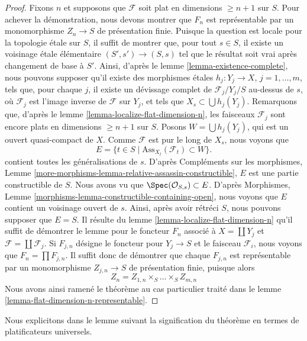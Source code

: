 \begin{proof}
\medskip\noindent
Fixons $n$ et supposons que $\mathcal{F}$ soit plat en dimensions $\geq n + 1$
sur $S$. Pour achever la démonstration, nous devons montrer que $F_n$ est représentable
par un monomorphisme $Z_n \to S$ de présentation finie.
Puisque la question est locale pour la topologie \'etale sur $S$, il suffit de
montrer que, pour tout $s \in S$, il existe un voisinage \'etale élémentaire
$(S', s') \to (S, s)$ tel que le résultat soit vrai après changement de base à $S'$.
Ainsi, d'après le
lemme \ref{lemma-existence-complete},
nous pouvons supposer qu'il existe des morphismes \'etales $h_j : Y_j \to X$,
$j = 1, \ldots, m$, tels que, pour chaque $j$, il existe un d\'evissage complet
de $\mathcal{F}_j/Y_j/S$ au-dessus de $s$,
où $\mathcal{F}_j$ est l'image inverse de $\mathcal{F}$ sur $Y_j$,
et tels que $X_s \subset \bigcup h_j(Y_j)$. Remarquons que, d'après le
lemme \ref{lemma-localize-flat-dimension-n},
les faisceaux $\mathcal{F}_j$ sont encore plats
en dimensions $\geq n + 1$ sur $S$.
Posons $W = \bigcup h_j(Y_j)$, qui est un ouvert quasi-compact de $X$.
Comme $\mathcal{F}$ est pur le long de $X_s$, nous voyons que
$$
E = \{t \in S \mid \text{Ass}_{X_t}(\mathcal{F}_t) \subset W \}.
$$
contient toutes les généralisations de $s$. D'après
Compléments sur les morphismes,
Lemme \ref{more-morphisms-lemma-relative-assassin-constructible},
$E$ est une partie constructible de $S$. Nous avons vu que
$\Spec(\mathcal{O}_{S, s}) \subset E$. D'après
Morphismes, Lemme \ref{morphisms-lemma-constructible-containing-open},
nous voyons que $E$ contient un voisinage ouvert de $s$.
Ainsi, après avoir rétréci $S$, nous pouvons supposer que $E = S$.
Il résulte du
lemme \ref{lemma-localize-flat-dimension-n}
qu'il suffit de démontrer le lemme pour le foncteur $F_n$ associé à
$X = \coprod Y_j$ et $\mathcal{F} = \coprod \mathcal{F}_j$.
Si $F_{j, n}$ désigne le foncteur pour $Y_j \to S$ et le faisceau
$\mathcal{F}_i$, nous voyons que $F_n = \prod F_{j, n}$. Il suffit donc
de démontrer que chaque $F_{j, n}$ est représentable par un monomorphisme
$Z_{j, n} \to S$ de présentation finie, puisque alors
$$
Z_n = Z_{1, n} \times_S \ldots \times_S Z_{m, n}
$$
Nous avons ainsi ramené le théorème au cas particulier traité dans le
lemme \ref{lemma-flat-dimension-n-representable}.
\end{proof}

\noindent
Nous explicitons dans le lemme suivant la signification du théorème en termes
de platificateurs universels.

